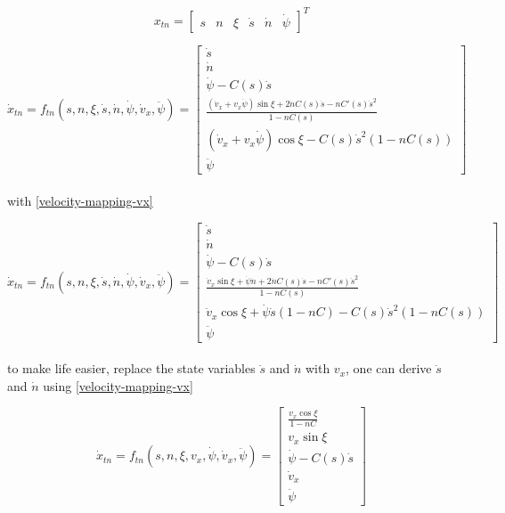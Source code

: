 \begin{equation}
	x_{tn} = \begin{bmatrix}
		s & n & \xi & \dot{s} & \dot{n} & \dot{\psi}
	\end{bmatrix}^T
\end{equation}

\begin{equation}
	\dot{x}_{tn} = f_{tn}(s, n, \xi, \dot{s}, \dot{n}, \dot{\psi}, \dot{v}_x, \ddot{\psi}) = \begin{bmatrix}
		\dot{s}                   \\
		\dot{n}                   \\
		\dot{\psi} - C(s) \dot{s} \\
		\frac{
			(\dot{v}_x + v_x\dot{\psi})\sin{\xi} +
			2\dot{n}C(s)\dot{s}-nC'(s)\dot{s}^2
		} {
			1-nC(s)
		}                         \\
		(\dot{v}_x + v_x\dot{\psi})\cos{\xi} -
		C(s)\dot{s}^2(1-nC(s))    \\
		\ddot{\psi}
	\end{bmatrix}
\end{equation}
\\
with \eqref{velocity-mapping-vx}

\begin{equation}
	\dot{x}_{tn} = f_{tn}(s, n, \xi, \dot{s}, \dot{n}, \dot{\psi}, \dot{v}_x, \ddot{\psi}) = \begin{bmatrix}
		\dot{s}                   \\
		\dot{n}                   \\
		\dot{\psi} - C(s) \dot{s} \\
		\frac{
			\dot{v}_x\sin{\xi} + \dot{\psi}\dot{n} +
			2\dot{n}C(s)\dot{s}-nC'(s)\dot{s}^2
		} {
			1-nC(s)
		}                         \\
		\dot{v}_x\cos{\xi} + \dot{\psi}\dot{s}(1-nC) -
		C(s)\dot{s}^2(1-nC(s))    \\
		\ddot{\psi}
	\end{bmatrix}
\end{equation}
\\
to make life easier, replace the state variables $\dot{s}$ and $\dot{n}$ with $v_x$, one can derive $\dot{s}$ and $\dot{n}$ using
\eqref{velocity-mapping-vx}

\begin{equation}
	\dot{x}_{tn} = f_{tn}(s, n, \xi, v_x, \dot{\psi}, \dot{v}_x, \ddot{\psi}) = \begin{bmatrix}
		\frac{v_x\cos{\xi}}{1-nC} \\
		v_x\sin{\xi}              \\
		\dot{\psi} - C(s) \dot{s} \\
		\dot{v}_x                 \\
		\ddot{\psi}
	\end{bmatrix}
\end{equation}